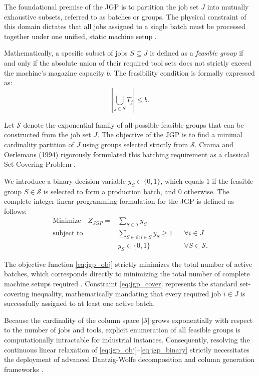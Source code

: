 \documentclass[11pt, a4paper]{book}
\begin{document}
	The foundational premise of the JGP is to partition the job set $J$ into mutually exhaustive subsets, referred to as batches or groups. The physical constraint of this domain dictates that all jobs assigned to a single batch must be processed together under one unified, static machine setup %
	.
	
	Mathematically, a specific subset of jobs $S \subseteq J$ is defined as a \textit{feasible group} if and only if the absolute union of their required tool sets does not strictly exceed the machine's magazine capacity $b$. The feasibility condition is formally expressed as:
	\begin{equation}
		\left| \bigcup_{j \in S} T_j \right| \le b.
	\end{equation}
	
	Let $\mathcal{S}$ denote the exponential family of all possible feasible groups that can be constructed from the job set $J$. The objective of the JGP is to find a minimal cardinality partition of $J$ using groups selected strictly from $\mathcal{S}$. Crama and Oerlemans (1994) rigorously formulated this batching requirement as a classical Set Covering Problem %
	.
	
	We introduce a binary decision variable $y_S \in \{0,1\}$, which equals $1$ if the feasible group $S \in \mathcal{S}$ is selected to form a production batch, and $0$ otherwise. The complete integer linear programming formulation for the JGP is defined as follows:
	\begin{align}
		\text{Minimize} \quad Z_{JGP} = & \sum_{S \in \mathcal{S}} y_S \label{eq:jgp_obj} \\
		\text{subject to} \quad & \sum_{S \in \mathcal{S} : i \in S} y_S \ge 1 && \forall i \in J \label{eq:jgp_cover} \\
		& y_S \in \{0,1\} && \forall S \in \mathcal{S}. \label{eq:jgp_binary}
	\end{align}
	
	The objective function \eqref{eq:jgp_obj} strictly minimizes the total number of active batches, which corresponds directly to minimizing the total number of complete machine setups required %
	. Constraint \eqref{eq:jgp_cover} represents the standard set-covering inequality, mathematically mandating that every required job $i \in J$ is successfully assigned to at least one active batch.
	
	Because the cardinality of the column space $|\mathcal{S}|$ grows exponentially with respect to the number of jobs and tools, explicit enumeration of all feasible groups is computationally intractable for industrial instances. Consequently, resolving the continuous linear relaxation of \eqref{eq:jgp_obj}--\eqref{eq:jgp_binary} strictly necessitates the deployment of advanced Dantzig-Wolfe decomposition and column generation frameworks %
	.
\end{document}
